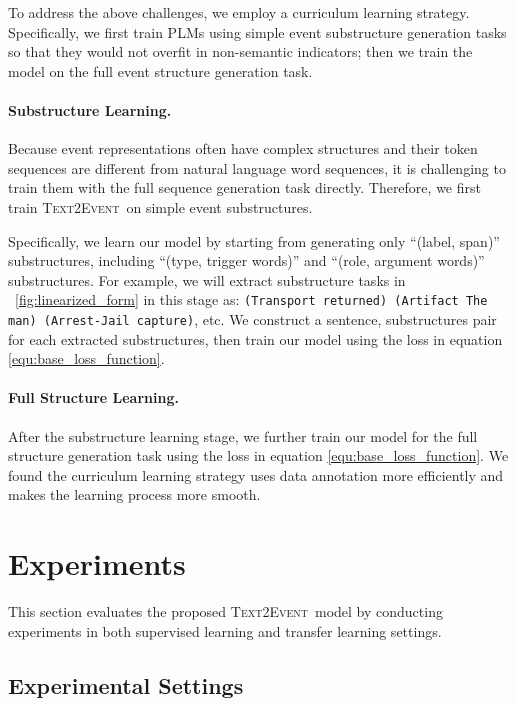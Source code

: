 \documentclass[11pt,a4paper]{article}
\newcommand\modelname{\textsc{Text2Event}}
\begin{document}
To address the above challenges, we employ a curriculum learning \citep{icml2009_006,xu-etal-2020-curriculum} strategy.
Specifically, we first train PLMs using simple event substructure generation tasks so that they would not overfit in non-semantic indicators;
then we train the model on the full event structure generation task.

\paragraph{Substructure Learning.}
Because event representations often have complex structures and their token sequences are different from natural language word sequences, it is challenging to train them with the full sequence generation task directly.
Therefore, we first train \modelname\, on simple event substructures.

Specifically, we learn our model by starting from generating only ``(label, span)'' substructures, including ``(type, trigger words)'' and ``(role, argument words)'' substructures.
For example, we will extract substructure tasks in \figurename~\ref{fig:linearized_form} in this stage as: \texttt{(Transport returned) (Artifact The man) (Arrest-Jail capture)}, etc.
We construct a sentence, substructures pair for each extracted substructures, then train our model using the loss in equation \ref{equ:base_loss_function}.

\paragraph{Full Structure Learning.}
After the substructure learning stage, we further train our model for the full structure generation task using the loss in equation \ref{equ:base_loss_function}.
We found the curriculum learning strategy uses data annotation more efficiently and makes the learning process more smooth.
 
\section{Experiments} \label{sec:experiment}

This section evaluates the proposed \modelname\, model by conducting experiments in both supervised learning and transfer learning settings.

\subsection{Experimental Settings} \label{sec:exp_settings}
\end{document}
